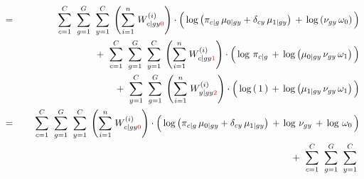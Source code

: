 \begin{enumerate}
\begin{eqnarray*}
&=&
	{\color{white}+} \;\;
	\overset{C}{\underset{c=1}{\sum}}\;\;
	\overset{G}{\underset{g=1}{\sum}}\;\;
	\overset{C}{\underset{y=1}{\sum}}\;
	\left(\overset{n}{\underset{i=1}{\sum}}\;W^{(i)}_{c \vert gy{\color{red}0}}\right)
	\cdot
	\left(\,
		\log\left(\pi_{c \vert g}\,\mu_{0 \vert gy} + \delta_{cy}\,\mu_{1\vert gy}\right)
		\,\overset{{\color{white}.}}{+}\,
		\log\left(\nu_{gy}\,\omega_{0}\right)
	\,\right)
\\
&&
	+ \;\;
	\overset{C}{\underset{c=1}{\sum}}\;\;
	\overset{G}{\underset{g=1}{\sum}}\;\;
	\overset{C}{\underset{y=1}{\sum}}\;
	\left(\overset{n}{\underset{i=1}{\sum}}\;W^{(i)}_{c \vert gy{\color{red}1}}\right)
	\cdot
	\left(\,
		\log\,\pi_{c \vert g}
		\,\overset{{\color{white}.}}{+}\,
		\log\left(\mu_{0\vert gy}\,\nu_{gy}\,\omega_{1}\right)
	\,\right)
\\
&&
	+ \;\;
	\overset{C}{\underset{y=1}{\sum}}\;\;
	\overset{G}{\underset{g=1}{\sum}}\;
	\left(\overset{n}{\underset{i=1}{\sum}}\;W^{(i)}_{y \vert gy{\color{red}2}}\right)
	\cdot
	\left(\,
		\log\left(\,1\,\right)
		\,\overset{{\color{white}.}}{+}\,
		\log\left(\mu_{1 \vert gy}\,\nu_{gy}\,\omega_{1}\right)
	\,\right)
\\
&=&
	{\color{white}+} \;\;
	\overset{C}{\underset{c=1}{\sum}}\;\;
	\overset{G}{\underset{g=1}{\sum}}\;\;
	\overset{C}{\underset{y=1}{\sum}}\;
	\left(\overset{n}{\underset{i=1}{\sum}}\;W^{(i)}_{c \vert gy{\color{red}0}}\right)
	\cdot
	\left(\,
		\log\left(\pi_{c \vert g}\,\mu_{0 \vert gy} + \delta_{cy}\,\mu_{1\vert gy}\right)
		\,\overset{{\color{white}.}}{+}\,
		\log\,\nu_{gy}
		\,\overset{{\color{white}.}}{+}\,
		\log\,\omega_{0}
	\,\right)
\\
&&
	+ \;\;
	\overset{C}{\underset{c=1}{\sum}}\;\;
	\overset{G}{\underset{g=1}{\sum}}\;\;
	\overset{C}{\underset{y=1}{\sum}}\;

\end{eqnarray*}
\end{enumerate}
